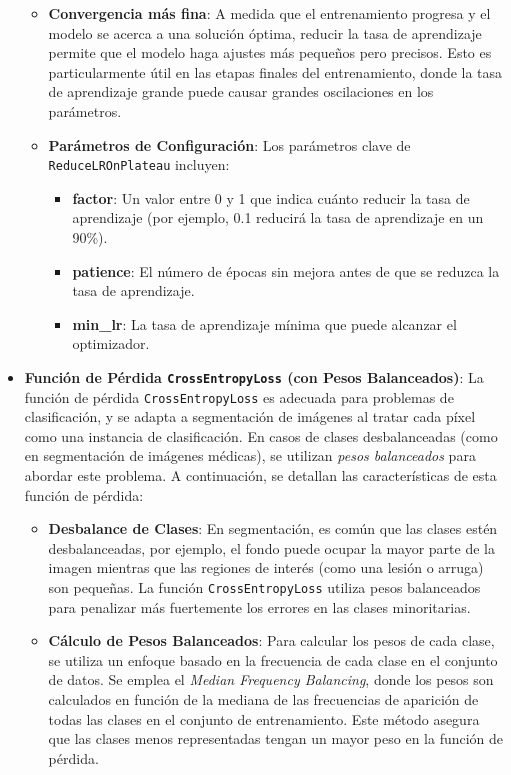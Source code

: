 \begin{itemize}
\begin{itemize}
        \item \textbf{Convergencia más fina}: 
        A medida que el entrenamiento progresa y el modelo se acerca a una solución óptima, reducir la tasa de aprendizaje permite que el modelo haga ajustes más pequeños pero precisos. Esto es particularmente útil en las etapas finales del entrenamiento, donde la tasa de aprendizaje grande puede causar grandes oscilaciones en los parámetros.

        \item \textbf{Parámetros de Configuración}: 
        Los parámetros clave de \texttt{ReduceLROnPlateau} incluyen:
        \begin{itemize}
            \item \textbf{factor}: Un valor entre 0 y 1 que indica cuánto reducir la tasa de aprendizaje (por ejemplo, 0.1 reducirá la tasa de aprendizaje en un 90\%).
            \item \textbf{patience}: El número de épocas sin mejora antes de que se reduzca la tasa de aprendizaje.
            \item \textbf{min\_lr}: La tasa de aprendizaje mínima que puede alcanzar el optimizador.
        \end{itemize}
    \end{itemize}

    \item \textbf{Función de Pérdida \texttt{CrossEntropyLoss} (con Pesos Balanceados)}:
    La función de pérdida \texttt{CrossEntropyLoss} es adecuada para problemas de clasificación, y se adapta a segmentación de imágenes al tratar cada píxel como una instancia de clasificación. En casos de clases desbalanceadas (como en segmentación de imágenes médicas), se utilizan \textit{pesos balanceados} para abordar este problema. A continuación, se detallan las características de esta función de pérdida:
    
    \begin{itemize}
        \item \textbf{Desbalance de Clases}: 
        En segmentación, es común que las clases estén desbalanceadas, por ejemplo, el fondo puede ocupar la mayor parte de la imagen mientras que las regiones de interés (como una lesión o arruga) son pequeñas. La función \texttt{CrossEntropyLoss} utiliza pesos balanceados para penalizar más fuertemente los errores en las clases minoritarias.
        
        \item \textbf{Cálculo de Pesos Balanceados}:
        Para calcular los pesos de cada clase, se utiliza un enfoque basado en la frecuencia de cada clase en el conjunto de datos. Se emplea el \textit{Median Frequency Balancing}, donde los pesos son calculados en función de la mediana de las frecuencias de aparición de todas las clases en el conjunto de entrenamiento. Este método asegura que las clases menos representadas tengan un mayor peso en la función de pérdida.


\end{itemize}
\end{itemize}
